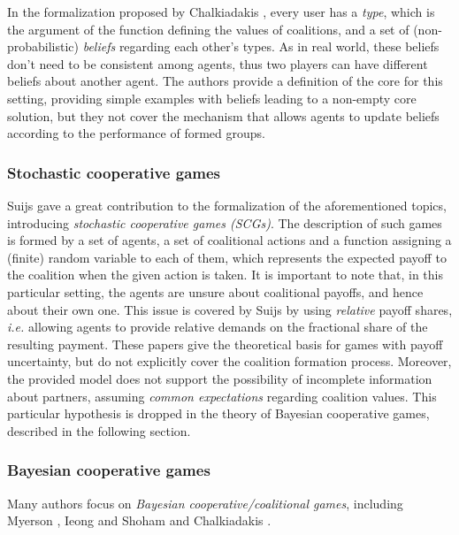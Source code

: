 \documentclass[11pt, twoside, titlepage, a4paper, openright]{report}
\begin{document}
In the formalization proposed by Chalkiadakis \cite{DBLP:conf/ijcai/ChalkiadakisEJ09}, every user has a \textit{type}, which is the argument of the function defining the values of coalitions, and a set of (non-probabilistic) \textit{beliefs} regarding each other's types. As in real world, these beliefs don't need to be consistent among agents, thus two players can have different beliefs about another agent. The authors provide a definition of the core for this setting, providing simple examples with beliefs leading to a non-empty core solution, but they not cover the mechanism that allows agents to update beliefs according to the performance of formed groups. 

\subsubsection{Stochastic cooperative games}

Suijs \cite{Suijs1999331,Suijs1999193} gave a great contribution to the formalization of the aforementioned topics, introducing \textit{stochastic cooperative games (SCGs)}. The description of such games is formed by a set of agents, a set of coalitional actions and a function assigning a (finite) random variable to each of them, which represents the expected payoff to the coalition when the given action is taken.
It is important to note that, in this particular setting, the agents are unsure about coalitional payoffs, and hence about their own one. This issue is covered by Suijs by using \textit{relative} payoff shares, \textit{i.e.} allowing agents to provide relative demands on the fractional share of the resulting payment.
These papers give the theoretical basis for games with payoff uncertainty, but do not explicitly cover the coalition formation process. Moreover, the provided model does not support the possibility of incomplete information about partners, assuming \textit{common expectations} regarding coalition values.
This particular hypothesis is dropped in the theory of Bayesian cooperative games, described in the following section.

\subsubsection{Bayesian cooperative games}

Many authors focus on \textit{Bayesian cooperative/coalitional games}, including Myerson \cite{springerlink:10.1007/3-540-26979-725,RogerB2007260}, Ieong and Shoham \cite{DBLP:conf/aaai/IeongS08} and Chalkiadakis \cite{Chalkiadakis:2007:BAM:1467514,DBLP:conf/atal/ChalkiadakisB04,DBLP:conf/ijcai/ChalkiadakisB07,DBLP:conf/atal/ChalkiadakisMB07}.
\end{document}
